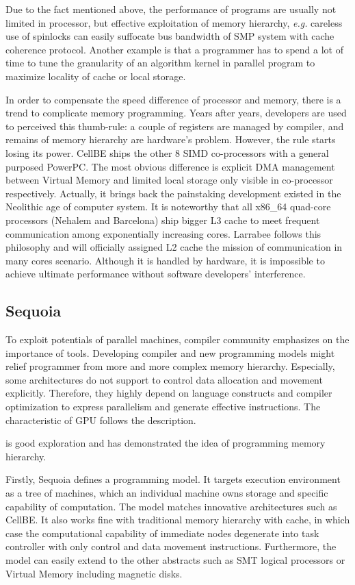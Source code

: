 \documentclass[a4paper, 11pt]{article}
\begin{document}
Due to the fact mentioned above, the performance of programs are usually not limited in processor, but effective exploitation of
memory hierarchy, \textit{e.g.} careless use of spinlocks can easily suffocate bus bandwidth of SMP system with cache coherence protocol. Another example is that a programmer has to spend a lot of time to tune the granularity of an algorithm kernel in parallel program to maximize locality of cache or local storage. 

In order to compensate the speed difference of processor and memory, there is a trend to complicate memory programming.
Years after years, developers are used to perceived this thumb-rule: a couple of registers are managed by compiler, and remains of memory hierarchy are hardware's problem. However, the rule starts losing its power. CellBE ships the other 8 SIMD co-processors with a general purposed PowerPC. The most obvious difference is explicit DMA management between Virtual Memory and limited local storage only visible in co-processor respectively. Actually, it brings back the painstaking development
existed in the Neolithic age of computer system.  It is noteworthy that all 
x86\_64  quad-core processors (Nehalem and Barcelona)  ship bigger L3
cache to meet frequent communication among exponentially increasing cores. Larrabee follows this philosophy and will officially
assigned L2 cache the mission of communication in many cores scenario. Although it is handled by hardware, it is impossible to achieve ultimate performance without software developers' interference.
 
\subsection{Sequoia}
To exploit potentials of parallel machines, compiler community \cite{dragonbook2e} emphasizes on  the importance of tools. Developing compiler and new programming models might relief programmer from more and more complex memory hierarchy. Especially, some architectures do not support to control data allocation and movement explicitly. Therefore, they highly depend on language constructs and compiler optimization to express parallelism and generate effective instructions. The characteristic of GPU follows the description.

\cite{DBLP:conf/sc/FatahalianHKLHPERADH06} is good exploration and has demonstrated the idea of programming memory hierarchy. 

Firstly, Sequoia defines a programming model. It  targets execution environment as a tree of machines, which an individual machine owns storage and specific capability of computation.  The model  matches innovative architectures such as CellBE. It also works fine with traditional memory hierarchy with cache, in which case the computational capability of immediate nodes degenerate into task controller with only control and data movement instructions. Furthermore, the model can easily extend to the other abstracts such as SMT logical processors or Virtual Memory including magnetic disks.
\end{document}
